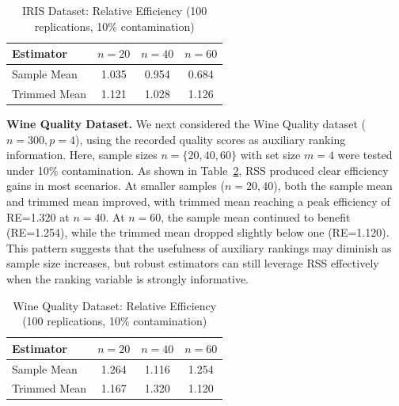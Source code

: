 \documentclass[12pt]{article}
\makeatletter
\let\oldparagraph\paragraph
\renewcommand{\paragraph}{
    \@ifstarcorollary
      \xxxParagraphStar
      \xxxParagraphNoStar
  }
\newcommand{\xxxParagraphStar}[1]{\oldparagraph*{#1}\mbox{}}
\newcommand{\xxxParagraphNoStar}[1]{\oldparagraph{#1}\mbox{}}
\makeatother
\begin{document}
\begin{table}[htbp]
\centering
\caption{IRIS Dataset: Relative Efficiency (100 replications, 10\% contamination)}
\label{tab:iris_results}
\begin{tabular}{lccc}
\hline
Estimator & $n=20$ & $n=40$ & $n=60$ \\
\hline
Sample Mean   & 1.035 & 0.954 & 0.684 \\
Trimmed Mean  & 1.121 & 1.028 & 1.126 \\
\hline
\end{tabular}
\end{table}


{\bf Wine Quality Dataset.}
We next considered the Wine Quality dataset ($n=300, p=4$), using the recorded quality scores as auxiliary ranking information.
Here, sample sizes $n=\{20,40,60\}$ with set size $m=4$ were tested under 10\% contamination.
As shown in Table~\ref{tab:wine_results}, RSS produced clear efficiency gains in most scenarios.
At smaller samples ($n=20,40$), both the sample mean and trimmed mean improved, with trimmed mean reaching a peak efficiency of RE=1.320 at $n=40$.
At $n=60$, the sample mean continued to benefit (RE=1.254), while the trimmed mean dropped slightly below one (RE=1.120).
This pattern suggests that the usefulness of auxiliary rankings may diminish as sample size increases, but robust estimators can still leverage RSS effectively when the ranking variable is strongly informative.

\begin{table}[htbp]
\centering
\caption{Wine Quality Dataset: Relative Efficiency (100 replications, 10\% contamination)}
\label{tab:wine_results}
\begin{tabular}{lccc}
\hline
Estimator & $n=20$ & $n=40$ & $n=60$ \\
\hline
Sample Mean   & 1.264 & 1.116 & 1.254 \\
Trimmed Mean  & 1.167 & 1.320 & 1.120 \\
\hline
\end{tabular}
\end{table}
\end{document}
